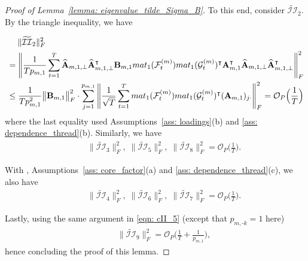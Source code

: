 \documentclass[10pt,a4paper]{amsart}
\def\bA{\mathbf{A}}
\def\bB{\mathbf{B}}
\def\cF{\mathcal{F}}
\def\cG{\mathcal{G}} \def\cH{\boldsymbol{\mathcal{H}}} \def\cI{\mathcal{I}}
\def\cII{\mathcal{II}}
\def\cO{\mathcal{O}}
\def\mat{\textnormal{\textsc{mat}}}
\def\trans{\intercal}
\def\wh#1{\widehat{#1}}
\def\wt#1{\widetilde{#1}}
\begin{document}
\begin{proof}[Proof of Lemma~\ref{lemma: eigenvalue_tilde_Sigma_B}]
To this end, consider $\wt\cII_2$. By the triangle inequality, we have

\begin{align}
    &\;\quad
    \|\wt\cII_2\|_F^2 \notag \\
    &=
    \Bigg\| \frac{1}{T p_{m,1}} \sum_{t=1}^T \wh{\bA}_{m,1,\perp} \wh{\bA}_{m,1,\perp}^\trans \bB_{m,1} \mat_1(\cF_t^{(m)}) \mat_1(\cG_t^{(m)})^\trans \bA_{m,1}^\trans \wh{\bA}_{m,1,\perp} \wh{\bA}_{m,1,\perp}^\trans \Bigg\|_F^2 \notag \\
    &\leq
    \frac{1}{T p_{m,1}^2} \big\|\bB_{m,1} \big\|_F^2 \cdot \sum_{j=1}^{p_{m,1}} \Bigg\| \frac{1}{\sqrt{T}} \sum_{t=1}^T \mat_1(\cF_t^{(m)}) \mat_1(\cG_t^{(m)})^\trans (\bA_{m,1})_{j\cdot} \Bigg\|_F^2 
    = \cO_P\Big( \frac{1}{T} \Big)
    \label{eqn: tilde_cII_2}
\end{align}
where the last equality used Assumptions~\ref{ass: loadings}(b) and \ref{ass: dependence_thread}(b). Similarly, we have
\begin{align}
    &\;\quad
    \|\wt\cII_3\|_F^2, \;
    \|\wt\cII_5\|_F^2, \;
    \|\wt\cII_8\|_F^2
    = \cO_P\Big( \frac{1}{T} \Big) .
    \label{eqn: tilde_cII_3_5_8}
\end{align}

With , Assumptions~\ref{ass: core_factor}(a) and \ref{ass: dependence_thread}(c), we also have 
\begin{align}
    &\;\quad
    \|\wt\cII_4\|_F^2, \;
    \|\wt\cII_6\|_F^2, \;
    \|\wt\cII_7\|_F^2
    = \cO_P\Big( \frac{1}{T} \Big) .
    \label{eqn: tilde_cII_4_6_7}
\end{align}

Lastly, using the same argument in \eqref{eqn: cII_5} (except that $p_{m,\text{-}k}=1$ here) \begin{align}
    &\;\quad
    \|\wt\cII_9\|_F^2 = \cO_P\Big( \frac{1}{T} + \frac{1}{p_{m,1}} \Big) ,
    \label{eqn: tilde_cII_9}
\end{align}
hence concluding the proof of this lemma.
\end{proof}
\end{document}
